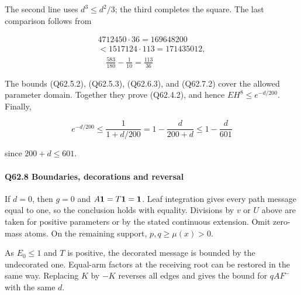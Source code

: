 The second line uses $d^3\le\allowbreak  d^2/3$; the third completes the square.
The last comparison follows from

\[
\begin{gathered}
4712450\cdot36=169648200\\
<1517124\cdot113=171435012,\\
\quad \frac{583}{180}-\frac1{10}=\frac{113}{36}
\end{gathered}
\]

The bounds (Q62.5.2), (Q62.5.3), (Q62.6.3), and (Q62.7.2) cover the allowed parameter domain.
Together they prove (Q62.4.2), and hence $EH^8\le\allowbreak  e^{-d/200}$.
Finally,

\[
e^{-d/200}\le\frac1{1+d/200}
=1-\frac{d}{200+d}\le1-\frac{d}{601}
\]

since $200+d\le\allowbreak 601$.


\paragraph{Q62.8 Boundaries, decorations and reversal}

If $d=\allowbreak 0$, then $g=\allowbreak 0$ and $A\mathbf1=\allowbreak T\mathbf1=\allowbreak \mathbf1$. Leaf integration gives every path message equal to one,
so the conclusion holds with equality. Divisions by $v$ or $U$ above are taken for positive parameters or by the stated continuous extension.
Omit zero-mass atoms. On the remaining support, $p,\allowbreak  q\ge\allowbreak \mu(x)>\allowbreak 0$.


As $E_0\le\allowbreak 1$ and $T$ is positive, the decorated message is bounded by the undecorated one.
Equal-arm factors at the receiving root can be restored in the same way.
Replacing $K$ by $-K$ reverses all edges and gives the bound for $qAF^-$ with the same $d$.
